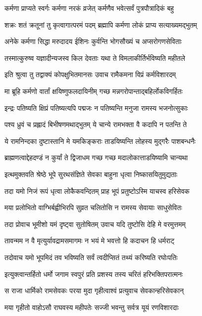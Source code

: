 \twolineshloka
{कर्मणा प्राप्यते स्वर्गः कर्मणा नरकं व्रजेत्}
{कर्मणैव भवेत्सर्वं पुत्रपौत्रादिकं बहु}%

\twolineshloka
{शक्रः शतं क्रतूनां तु कृत्वागात्परमं पदम्}
{ब्रह्मापि कर्मणा लोकं प्राप्य सत्याख्यमद्भुतम्}%

\twolineshloka
{अनेके कर्मणा सिद्धा मरुदादय ईशिनः}
{कुर्वन्ति भोगसौख्यं च अप्सरोगणसेविताः}%

\twolineshloka
{तस्मात्कुरुष्व यज्ञादीन्यजस्व किल देवताः}
{यथा ते विमलाकीर्तिर्भविष्यति महीतले}%

\twolineshloka
{इति श्रुत्वा तु तद्वाक्यं कोपक्षुभितमानसः}
{उवाच रामैकमना विप्रं कर्मविशारदम्}%

\twolineshloka
{मा ब्रूहि कर्मणो वार्तां क्षयिष्णुफलदायिनीम्}
{गच्छ मन्नगरोपान्ताद्बहिर्लोकविगर्हितः}%

\twolineshloka
{इन्द्रः पतिष्यति क्षिप्रं पतिष्यत्यपि पद्मजः}
{न पतिष्यन्ति मनुजा रामस्य भजनोत्सुकाः}%

\twolineshloka
{पश्य ध्रुवं च प्रह्लादं बिभीषणमथाद्भुतम्}
{ये चान्ये रामभक्ता वै कदापि न पतन्ति ते}%

\twolineshloka
{ये रामनिन्दका दुष्टास्तानि मे यमकिङ्कराः}
{ताडयिष्यन्ति लोहस्य मुद्गरैः पाशबन्धनैः}%

\twolineshloka
{ब्राह्मणत्वाद्देहदण्डं न कुर्यां ते द्विजाधम}
{गच्छ गच्छ मदालोकात्ताडयिष्यामि चान्यथा}%

\twolineshloka
{इत्थमुक्तवति श्रेष्ठे भूपे सुरथसंज्ञिते}
{सेवका बाहुना धृत्वा निष्कासयितुमुद्यताः}%

\twolineshloka
{तदा यमो निजं रूपं धृत्वा लोकैकवन्दितम्}
{प्राह भूपं प्रतुष्टोऽस्मि याचस्व हरिसेवक}%

\twolineshloka
{मया प्रलोभितो वाग्भिर्बह्वीभिरपि सुव्रत}
{चलितोसि न रामस्य सेवायाः साधुसेवितः}%

\twolineshloka
{तदा प्रोवाच भूमीशो यमं दृष्ट्वा सुतोषितम्}
{उवाच यदि तुष्टोसि देहि मे वरमुत्तमम्}%

\twolineshloka
{तावन्मम न वै मृत्युर्यावद्रामसमागमः}
{न भयं मे भवत्तो हि कदाचन हि धर्मराट्}%

\twolineshloka
{तदोवाच यमो भूपमिदं तव भविष्यति}
{सर्वं त्वदीप्सितं तथ्यं करिष्यति रघोःपतिः}%

\twolineshloka
{इत्युक्त्वान्तर्हितो धर्मो जगाम स्वपुरं प्रति}
{प्रशस्य तस्य चरितं हरिभक्तिपरात्मनः}%

\twolineshloka
{स राजा धार्मिको रामसेवकः परया मुदा}
{गृहीत्वाश्वं प्रत्युवाच सेवकान्हरिसेवकान्}%

\twolineshloka
{मया गृहीतो वाहोऽसौ राघवस्य महीपतेः}
{सज्जी भवन्तु सर्वत्र यूयं रणविशारदाः}%

